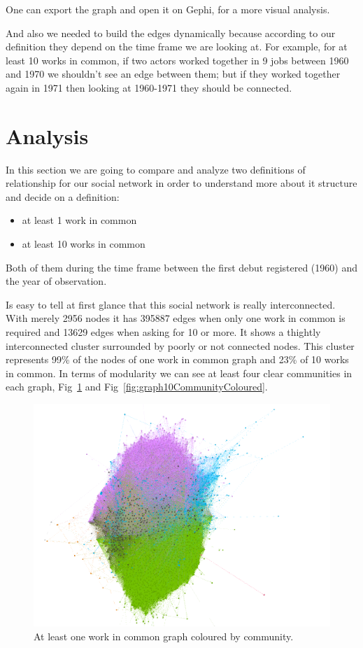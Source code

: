 One can export the graph and open it on Gephi, for a more visual analysis.

And also we needed to build the edges dynamically because according to our definition they depend on the time frame we are looking at. For example, for at least 10 works in common, if two actors worked together in 9 jobs between 1960 and 1970 we shouldn't see an edge between them; but if they worked together again in 1971 then looking at 1960-1971 they should be connected.

\section{Analysis}
In this section we are going to compare and analyze two definitions of relationship for our social network in order to understand more about it structure and decide on a definition:
\begin{itemize}
\item at least 1 work in common
\item at least 10 works in common
\end{itemize}
Both of them during the time frame between the first debut registered (1960) and the year of observation.

Is easy to tell at first glance that this social network is really interconnected. With merely 2956 nodes it has 395887 edges when only one work in common is required and 13629 edges when asking for 10 or more. It shows a thightly interconnected cluster surrounded by poorly or not connected nodes. This cluster represents 99\% of the nodes of one work in common graph and 23\% of 10 works in common. In terms of modularity we can see at least four clear communities in each graph, Fig~\ref{fig:graph1CommunityColoured} and Fig~\ref{fig:graph10CommunityColoured}.

\begin{figure}[!hbt]
	\begin{center}
	\includegraphics[width=\columnwidth]{graphics/atLeast1WorkCommunity.png}
	\caption{At least one work in common graph coloured by community.}
	\label{fig:graph1CommunityColoured}
	\end{center}
\end{figure}

